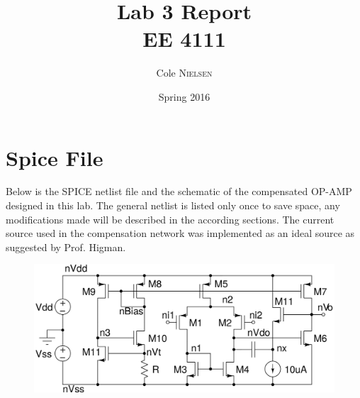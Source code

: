 \documentclass[12pt]{article}
\title{Lab 3 Report\\ \vspace{0.3 in} EE 4111}
\author{Cole \textsc{Nielsen}}
\date{Spring 2016}
\begin{document}
\maketitle 
\pagebreak
\section*{Spice File}
Below is the SPICE netlist file and the schematic of the compensated OP-AMP designed in this lab. The general netlist is listed only once to save space, any modifications made will be described in the according sections. The current source used in the compensation network was implemented as an ideal source as suggested by Prof. Higman.
\FloatBarrier
\begin{figure}[h!]
\begin{center}
 \includegraphics[scale=0.14]{./schem.png}
\end{center}
\end{figure}
\FloatBarrier
\end{document}
